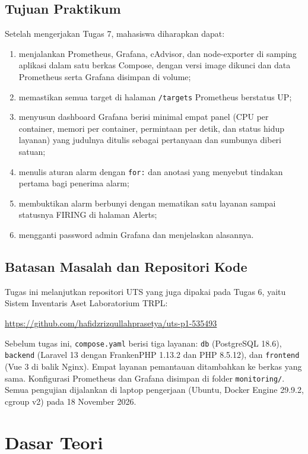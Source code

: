 \documentclass[a4paper,oneside,12pt]{report}
\begin{document}
\section{Tujuan Praktikum}
Setelah mengerjakan Tugas 7, mahasiswa diharapkan dapat:
\begin{enumerate}
    \item menjalankan Prometheus, Grafana, cAdvisor, dan node-exporter di samping aplikasi dalam satu berkas Compose, dengan versi image dikunci dan data Prometheus serta Grafana disimpan di volume;
    \item memastikan semua target di halaman \texttt{/targets} Prometheus berstatus UP;
    \item menyusun dashboard Grafana berisi minimal empat panel (CPU per container, memori per container, permintaan per detik, dan status hidup layanan) yang judulnya ditulis sebagai pertanyaan dan sumbunya diberi satuan;
    \item menulis aturan alarm dengan \texttt{for:} dan anotasi yang menyebut tindakan pertama bagi penerima alarm;
    \item membuktikan alarm berbunyi dengan mematikan satu layanan sampai statusnya FIRING di halaman Alerts;
    \item mengganti password admin Grafana dan menjelaskan alasannya.
\end{enumerate}

\section{Batasan Masalah dan Repositori Kode}
Tugas ini melanjutkan repositori UTS yang juga dipakai pada Tugas 6, yaitu Sistem Inventaris Aset Laboratorium TRPL:
\begin{center}
    \url{https://github.com/hafidzrizqullahprasetya/uts-p1-535493}
\end{center}
Sebelum tugas ini, \texttt{compose.yaml} berisi tiga layanan: \texttt{db} (PostgreSQL 18.6), \texttt{backend} (Laravel 13 dengan FrankenPHP 1.13.2 dan PHP 8.5.12), dan \texttt{frontend} (Vue 3 di balik Nginx). Empat layanan pemantauan ditambahkan ke berkas yang sama. Konfigurasi Prometheus dan Grafana disimpan di folder \texttt{monitoring/}. Semua pengujian dijalankan di laptop pengerjaan (Ubuntu, Docker Engine 29.9.2, cgroup v2) pada 18 November 2026.

\clearpage

\chapter{Dasar Teori}
\end{document}

